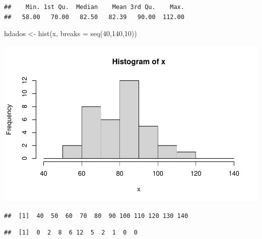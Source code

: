 \documentclass[
]{article}
\newenvironment{Shaded}{\begin{snugshade}}{\end{snugshade}}
\newcommand{\AttributeTok}[1]{\textcolor[rgb]{0.77,0.63,0.00}{#1}}
\newcommand{\DecValTok}[1]{\textcolor[rgb]{0.00,0.00,0.81}{#1}}
\newcommand{\FunctionTok}[1]{\textcolor[rgb]{0.00,0.00,0.00}{#1}}
\newcommand{\NormalTok}[1]{#1}
\newcommand{\OtherTok}[1]{\textcolor[rgb]{0.56,0.35,0.01}{#1}}
\newcommand{\SpecialCharTok}[1]{\textcolor[rgb]{0.00,0.00,0.00}{#1}}
\begin{document}
\begin{verbatim}
##    Min. 1st Qu.  Median    Mean 3rd Qu.    Max. 
##   58.00   70.00   82.50   82.39   90.00  112.00
\end{verbatim}

\begin{Shaded}
\begin{Highlighting}[]
\NormalTok{hdados }\OtherTok{\textless{}{-}} \FunctionTok{hist}\NormalTok{(x, }
               \AttributeTok{breaks =} \FunctionTok{seq}\NormalTok{(}\DecValTok{40}\NormalTok{,}\DecValTok{140}\NormalTok{,}\DecValTok{10}\NormalTok{))}
\end{Highlighting}
\end{Shaded}

\includegraphics{DistNormal_files/figure-latex/unnamed-chunk-12-1.pdf}

\begin{Shaded}
\end{Shaded}

\begin{verbatim}
##  [1]  40  50  60  70  80  90 100 110 120 130 140
\end{verbatim}

\begin{Shaded}
\end{Shaded}

\begin{verbatim}
##  [1]  0  2  8  6 12  5  2  1  0  0
\end{verbatim}
\end{document}
